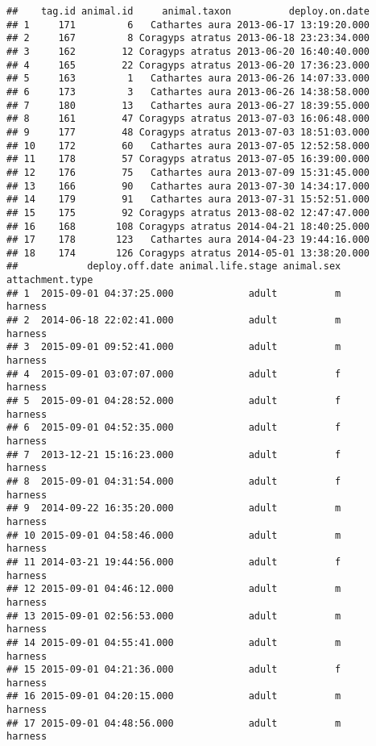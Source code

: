 \documentclass[
]{article}
\begin{document}
\begin{verbatim}
##    tag.id animal.id     animal.taxon          deploy.on.date
## 1     171         6   Cathartes aura 2013-06-17 13:19:20.000
## 2     167         8 Coragyps atratus 2013-06-18 23:23:34.000
## 3     162        12 Coragyps atratus 2013-06-20 16:40:40.000
## 4     165        22 Coragyps atratus 2013-06-20 17:36:23.000
## 5     163         1   Cathartes aura 2013-06-26 14:07:33.000
## 6     173         3   Cathartes aura 2013-06-26 14:38:58.000
## 7     180        13   Cathartes aura 2013-06-27 18:39:55.000
## 8     161        47 Coragyps atratus 2013-07-03 16:06:48.000
## 9     177        48 Coragyps atratus 2013-07-03 18:51:03.000
## 10    172        60   Cathartes aura 2013-07-05 12:52:58.000
## 11    178        57 Coragyps atratus 2013-07-05 16:39:00.000
## 12    176        75   Cathartes aura 2013-07-09 15:31:45.000
## 13    166        90   Cathartes aura 2013-07-30 14:34:17.000
## 14    179        91   Cathartes aura 2013-07-31 15:52:51.000
## 15    175        92 Coragyps atratus 2013-08-02 12:47:47.000
## 16    168       108 Coragyps atratus 2014-04-21 18:40:25.000
## 17    178       123   Cathartes aura 2014-04-23 19:44:16.000
## 18    174       126 Coragyps atratus 2014-05-01 13:38:20.000
##            deploy.off.date animal.life.stage animal.sex attachment.type
## 1  2015-09-01 04:37:25.000             adult          m         harness
## 2  2014-06-18 22:02:41.000             adult          m         harness
## 3  2015-09-01 09:52:41.000             adult          m         harness
## 4  2015-09-01 03:07:07.000             adult          f         harness
## 5  2015-09-01 04:28:52.000             adult          f         harness
## 6  2015-09-01 04:52:35.000             adult          f         harness
## 7  2013-12-21 15:16:23.000             adult          f         harness
## 8  2015-09-01 04:31:54.000             adult          f         harness
## 9  2014-09-22 16:35:20.000             adult          m         harness
## 10 2015-09-01 04:58:46.000             adult          m         harness
## 11 2014-03-21 19:44:56.000             adult          f         harness
## 12 2015-09-01 04:46:12.000             adult          m         harness
## 13 2015-09-01 02:56:53.000             adult          m         harness
## 14 2015-09-01 04:55:41.000             adult          m         harness
## 15 2015-09-01 04:21:36.000             adult          f         harness
## 16 2015-09-01 04:20:15.000             adult          m         harness
## 17 2015-09-01 04:48:56.000             adult          m         harness

\end{verbatim}
\end{document}
